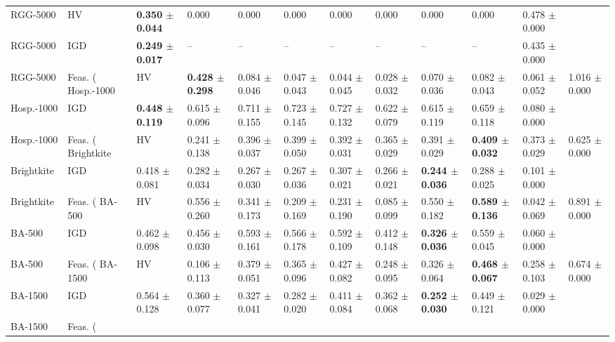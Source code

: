 \begin{tabular}{lllllllllll}
RGG-5000 & HV & \textbf{0.350 $\pm$ 0.044} & 0.000 & 0.000 & 0.000 & 0.000 & 0.000 & 0.000 & 0.000 & 0.478 $\pm$ 0.000 \\
RGG-5000 & IGD & \textbf{0.249 $\pm$ 0.017} & -- & -- & -- & -- & -- & -- & -- & 0.435 $\pm$ 0.000 \\
RGG-5000 & Feas. (%
Hosp.-1000 & HV & \textbf{0.428 $\pm$ 0.298} & 0.084 $\pm$ 0.046 & 0.047 $\pm$ 0.043 & 0.044 $\pm$ 0.045 & 0.028 $\pm$ 0.032 & 0.070 $\pm$ 0.036 & 0.082 $\pm$ 0.043 & 0.061 $\pm$ 0.052 & 1.016 $\pm$ 0.000 \\
Hosp.-1000 & IGD & \textbf{0.448 $\pm$ 0.119} & 0.615 $\pm$ 0.096 & 0.711 $\pm$ 0.155 & 0.723 $\pm$ 0.145 & 0.727 $\pm$ 0.132 & 0.622 $\pm$ 0.079 & 0.615 $\pm$ 0.119 & 0.659 $\pm$ 0.118 & 0.080 $\pm$ 0.000 \\
Hosp.-1000 & Feas. (%
Brightkite & HV & 0.241 $\pm$ 0.138 & 0.396 $\pm$ 0.037 & 0.399 $\pm$ 0.050 & 0.392 $\pm$ 0.031 & 0.365 $\pm$ 0.029 & 0.391 $\pm$ 0.029 & \textbf{0.409 $\pm$ 0.032} & 0.373 $\pm$ 0.029 & 0.625 $\pm$ 0.000 \\
Brightkite & IGD & 0.418 $\pm$ 0.081 & 0.282 $\pm$ 0.034 & 0.267 $\pm$ 0.030 & 0.267 $\pm$ 0.036 & 0.307 $\pm$ 0.021 & 0.266 $\pm$ 0.021 & \textbf{0.244 $\pm$ 0.036} & 0.288 $\pm$ 0.025 & 0.101 $\pm$ 0.000 \\
Brightkite & Feas. (%
BA-500 & HV & 0.556 $\pm$ 0.260 & 0.341 $\pm$ 0.173 & 0.209 $\pm$ 0.169 & 0.231 $\pm$ 0.190 & 0.085 $\pm$ 0.099 & 0.550 $\pm$ 0.182 & \textbf{0.589 $\pm$ 0.136} & 0.042 $\pm$ 0.069 & 0.891 $\pm$ 0.000 \\
BA-500 & IGD & 0.462 $\pm$ 0.098 & 0.456 $\pm$ 0.030 & 0.593 $\pm$ 0.161 & 0.566 $\pm$ 0.178 & 0.592 $\pm$ 0.109 & 0.412 $\pm$ 0.148 & \textbf{0.326 $\pm$ 0.036} & 0.559 $\pm$ 0.045 & 0.060 $\pm$ 0.000 \\
BA-500 & Feas. (%
BA-1500 & HV & 0.106 $\pm$ 0.113 & 0.379 $\pm$ 0.051 & 0.365 $\pm$ 0.096 & 0.427 $\pm$ 0.082 & 0.248 $\pm$ 0.095 & 0.326 $\pm$ 0.064 & \textbf{0.468 $\pm$ 0.067} & 0.258 $\pm$ 0.103 & 0.674 $\pm$ 0.000 \\
BA-1500 & IGD & 0.564 $\pm$ 0.128 & 0.360 $\pm$ 0.077 & 0.327 $\pm$ 0.041 & 0.282 $\pm$ 0.020 & 0.411 $\pm$ 0.084 & 0.362 $\pm$ 0.068 & \textbf{0.252 $\pm$ 0.030} & 0.449 $\pm$ 0.121 & 0.029 $\pm$ 0.000 \\
BA-1500 & Feas. (%
\bottomrule
\end{tabular}

